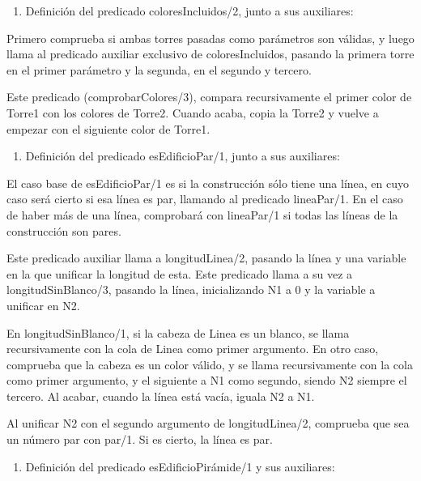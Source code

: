 \documentclass{article} %
\begin{document}
\noindent 

\begin{enumerate}
\item  Definición del predicado coloresIncluidos/2, junto a sus auxiliares:
\end{enumerate}

\noindent Primero comprueba si ambas torres pasadas como parámetros son válidas, y luego llama al predicado auxiliar exclusivo de coloresIncluidos, pasando la primera torre en el primer parámetro y la segunda, en el segundo y tercero.

\noindent Este predicado (comprobarColores/3), compara recursivamente el primer color de Torre1 con los colores de Torre2. Cuando acaba, copia la Torre2 y vuelve a empezar con el siguiente color de Torre1.

\noindent 

\begin{enumerate}
\item  Definición del predicado esEdificioPar/1, junto a sus auxiliares:
\end{enumerate}

\noindent El caso base de esEdificioPar/1 es si la construcción sólo tiene una línea, en cuyo caso será cierto si esa línea es par, llamando al predicado lineaPar/1. En el caso de haber más de una línea, comprobará con lineaPar/1 si todas las líneas de la construcción son pares.

\noindent Este predicado auxiliar llama a longitudLinea/2, pasando la línea y una variable en la que unificar la longitud de esta. Este predicado llama a su vez a longitudSinBlanco/3, pasando la línea, inicializando N1 a 0 y la variable a unificar en N2. 

\noindent En longitudSinBlanco/1, si la cabeza de Linea es un blanco, se llama recursivamente con la cola de Linea como primer argumento. En otro caso, comprueba que la cabeza es un color válido, y se llama recursivamente con la cola como primer argumento, y el siguiente a N1 como segundo, siendo N2 siempre el tercero. Al acabar, cuando la línea está vacía, iguala N2 a N1.

\noindent  Al unificar N2 con el segundo argumento de longitudLinea/2, comprueba que sea un número par con par/1. Si es cierto, la línea es par.

\noindent 

\begin{enumerate}
\item  Definición del predicado esEdificioPirámide/1 y sus auxiliares:
\end{enumerate}

\noindent 
\end{document}

